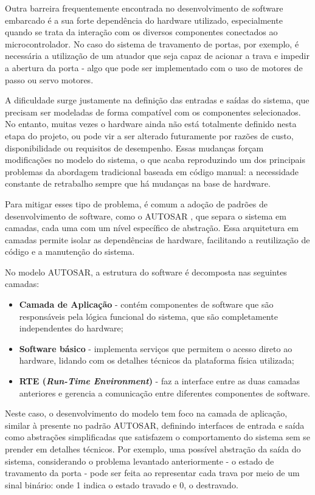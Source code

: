 Outra barreira frequentemente  encontrada no desenvolvimento de software embarcado é a sua forte dependência do hardware utilizado, especialmente quando se trata 
da interação com os diversos componentes conectados ao microcontrolador. No caso do sistema de travamento de portas, por exemplo, é necessária a utilização de um 
atuador que seja capaz de acionar a trava e impedir a abertura da porta - algo que pode ser implementado com o uso de motores de passo ou servo motores.

A dificuldade surge justamente na definição das entradas e saídas do sistema, que precisam ser modeladas de forma compatível com os componentes selecionados. No 
entanto, muitas vezes o hardware ainda não está totalmente definido nesta etapa do projeto, ou pode vir a ser alterado futuramente por razões de custo, 
disponibilidade ou requisitos de desempenho. Essas mudanças forçam modificações no modelo do sistema, o que acaba reproduzindo um dos principais problemas da 
abordagem tradicional baseada em código manual: a necessidade constante de retrabalho sempre que há mudanças na base de hardware.

Para mitigar esses tipo de problema, é comum a adoção de padrões de desenvolvimento de software, como o AUTOSAR \cite{autosarClassic}, que separa o sistema em 
camadas, cada uma com um nível específico de abstração. Essa arquitetura em camadas permite isolar as dependências de hardware, facilitando a reutilização de 
código e a manutenção do sistema. 

No modelo AUTOSAR, a estrutura do software é decomposta nas seguintes camadas:

\begin{itemize}
	\item \textbf{Camada de Aplicação} - contém componentes de software que são responsáveis pela lógica funcional do sistema, que são completamente independentes do hardware;
	\item \textbf{Software básico} - implementa serviços que permitem o acesso direto ao hardware, lidando com os detalhes técnicos da plataforma física utilizada;
	\item \textbf{RTE (\textit{Run-Time Environment})} - faz a interface entre as duas camadas anteriores e gerencia a comunicação entre diferentes componentes de software.
\end{itemize}

Neste caso, o desenvolvimento do modelo tem foco na camada de aplicação, similar à presente no padrão AUTOSAR, definindo interfaces de entrada e saída como 
abstrações simplificadas que satisfazem o comportamento do sistema sem se prender em detalhes técnicos. Por exemplo, uma possível abstração da saída do sistema, 
considerando o problema levantado anteriormente - o estado de travamento da porta - pode ser feita ao representar cada trava por meio de um sinal binário: onde 
1 indica o estado travado e 0, o destravado. 

